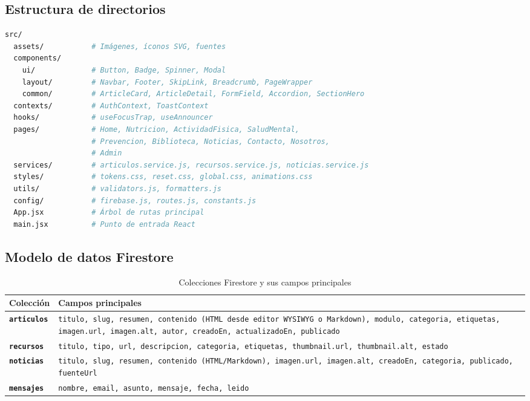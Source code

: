 \documentclass[12pt, a4paper]{article}
\begin{document}
\subsection{Estructura de directorios}

\begin{lstlisting}[language=bash, caption={Árbol de directorios de \texttt{src/}}]
src/
  assets/           # Imágenes, íconos SVG, fuentes
  components/
    ui/             # Button, Badge, Spinner, Modal
    layout/         # Navbar, Footer, SkipLink, Breadcrumb, PageWrapper
    common/         # ArticleCard, ArticleDetail, FormField, Accordion, SectionHero
  contexts/         # AuthContext, ToastContext
  hooks/            # useFocusTrap, useAnnouncer
  pages/            # Home, Nutricion, ActividadFisica, SaludMental,
                    # Prevencion, Biblioteca, Noticias, Contacto, Nosotros,
                    # Admin
  services/         # articulos.service.js, recursos.service.js, noticias.service.js
  styles/           # tokens.css, reset.css, global.css, animations.css
  utils/            # validators.js, formatters.js
  config/           # firebase.js, routes.js, constants.js
  App.jsx           # Árbol de rutas principal
  main.jsx          # Punto de entrada React
\end{lstlisting}

\subsection{Modelo de datos Firestore}

\begin{table}[H]
\centering
\caption{Colecciones Firestore y sus campos principales}
\begin{tabular}{@{}>{\bfseries}p{2.5cm} p{11cm}@{}}
\toprule
\rowcolor{royalblue!12}
\textbf{Colección} & \textbf{Campos principales} \\
\midrule
\texttt{articulos} & \texttt{titulo, slug, resumen, contenido (HTML desde editor WYSIWYG o Markdown), modulo, categoria, etiquetas, imagen.url, imagen.alt, autor, creadoEn, actualizadoEn, publicado} \\
\texttt{recursos} & \texttt{titulo, tipo, url, descripcion, categoria, etiquetas, thumbnail.url, thumbnail.alt, estado} \\
\texttt{noticias} & \texttt{titulo, slug, resumen, contenido (HTML/Markdown), imagen.url, imagen.alt, creadoEn, categoria, publicado, fuenteUrl} \\
\texttt{mensajes} & \texttt{nombre, email, asunto, mensaje, fecha, leido} \\
\bottomrule
\end{tabular}
\end{table}
\end{document}
